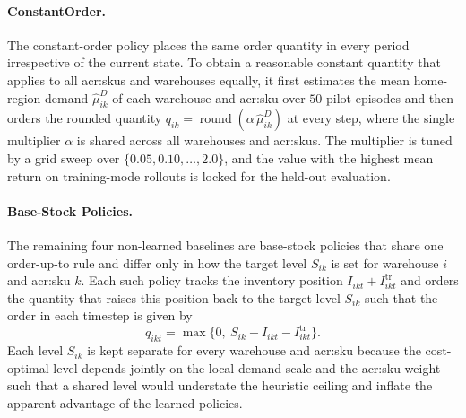 \paragraph{\textbf{ConstantOrder.}} The constant-order policy places the same order quantity in
every period irrespective of the current state. To obtain a reasonable constant quantity that applies to all \glspl{acr:sku} and warehouses equally, it first
estimates the mean home-region demand $\hat\mu^D_{ik}$ of each warehouse and \gls{acr:sku} over $50$ pilot episodes and then orders the rounded quantity $q_{ik}=\operatorname{round}(\alpha\,\hat\mu^D_{ik})$ at every step, where the single
multiplier $\alpha$ is shared across all warehouses and \glspl{acr:sku}. The
multiplier is tuned by a grid sweep over $\{0.05,0.10,\dots,2.0\}$, and the value
with the highest mean return on training-mode rollouts is locked for the held-out
evaluation.

\paragraph{\textbf{Base-Stock Policies.}} The remaining four non-learned baselines are base-stock policies \citep{Vericourt2001} that share one
order-up-to rule and differ only in how the target level $S_{ik}$ is set for
warehouse $i$ and \gls{acr:sku} $k$. Each such
policy tracks the inventory position $I_{ikt}+I^{\mathrm{tr}}_{ikt}$ and orders the quantity that raises this position back to the
target level $S_{ik}$ such that the order in each timestep is given by 
\begin{equation}
\label{eq:bs-order}
  q_{ikt}=\max\!\big\{0,\ S_{ik}-I_{ikt}-I^{\mathrm{tr}}_{ikt}\big\}.
\end{equation}
Each level $S_{ik}$ is kept separate for every warehouse and \gls{acr:sku} because the cost-optimal level
depends jointly on the local demand scale and the \gls{acr:sku} weight such that a shared
level would understate the heuristic ceiling and inflate the apparent advantage of
the learned policies.

